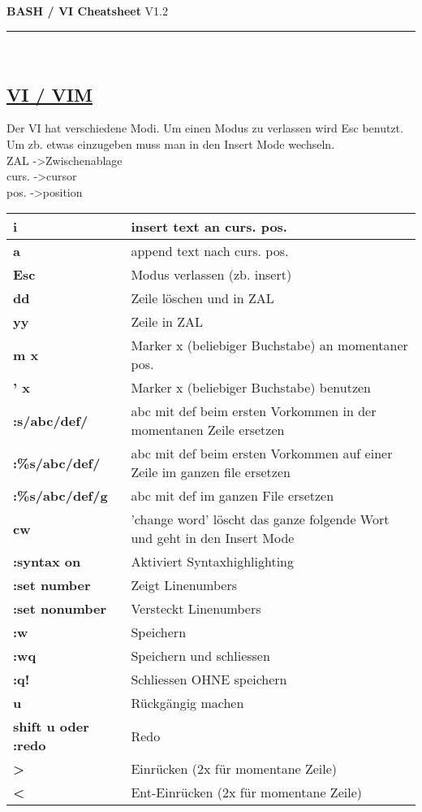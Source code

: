 \documentclass[a4paper,10pt,landscape]{article}
\begin{document}
\begin{center}
     {\bf \Large{BASH / VI Cheatsheet}}  \footnotesize{V1.2} \\
\rule{\linewidth}{0.25pt}\\
\end{center}


\raggedright
\begin{multicols}{2}
\footnotesize


\setlength{\premulticols}{1pt}
\setlength{\postmulticols}{1pt}
\setlength{\multicolsep}{1pt}
\setlength{\columnsep}{2pt}

\section{\underline{VI / VIM}}
\vspace{3mm}
Der VI hat verschiedene Modi. Um einen Modus zu verlassen wird Esc benutzt. Um zb. etwas einzugeben muss man in den Insert Mode wechseln.\\
\vspace{2mm}
ZAL -\textgreater Zwischenablage\\
curs. -\textgreater cursor\\
pos. -\textgreater position\\
\vspace{2mm}
\begin{tabular}{>{\raggedright}p{5cm}>{\raggedright}p{8cm}}
{\bf i} & insert text an curs. pos.\tabularnewline\hline
{\bf a} & append text nach curs. pos.\tabularnewline\hline
{\bf Esc} & Modus verlassen (zb. insert)\tabularnewline\hline
{\bf dd} &  Zeile löschen und in ZAL\tabularnewline\hline
{\bf yy} &  Zeile in ZAL\tabularnewline\hline
{\bf m x} &  Marker x (beliebiger Buchstabe) an momentaner pos.\tabularnewline\hline
{\bf ' x} &  Marker x (beliebiger Buchstabe) benutzen\tabularnewline\hline
{\bf :s/abc/def/} & abc mit def beim ersten Vorkommen in der momentanen Zeile ersetzen\tabularnewline\hline
{\bf :\%s/abc/def/} & abc mit def beim ersten Vorkommen auf einer Zeile im ganzen file ersetzen\tabularnewline\hline
{\bf :\%s/abc/def/g} & abc mit def im ganzen File ersetzen\tabularnewline\hline
{\bf cw} & 'change word' löscht das ganze folgende Wort und geht in den Insert Mode\tabularnewline\hline
{\bf :syntax on} & Aktiviert Syntaxhighlighting\tabularnewline\hline
{\bf :set number} & Zeigt Linenumbers\tabularnewline\hline
{\bf :set nonumber} & Versteckt Linenumbers\tabularnewline\hline
{\bf :w} & Speichern\tabularnewline\hline
{\bf :wq} & Speichern und schliessen\tabularnewline\hline
{\bf :q!} & Schliessen OHNE speichern\tabularnewline\hline
{\bf u} & Rückgängig machen\tabularnewline\hline
{\bf shift u oder :redo} & Redo\tabularnewline\hline
{\bf \textgreater} & Einrücken (2x für momentane Zeile)\tabularnewline\hline
{\bf \textless} & Ent-Einrücken (2x für momentane Zeile)\tabularnewline\hline
\end{tabular}



\end{multicols}
\end{document}
